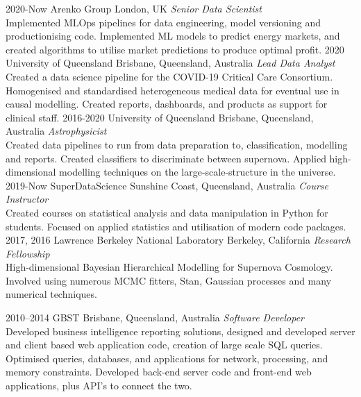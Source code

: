 \documentclass[]{friggeri-cv2}
\begin{document}
\begin{entrylist}

\entry
{2020-Now}
{Arenko Group}
{London, UK}
{\emph{Senior Data Scientist} \\
Implemented MLOps pipelines for data engineering, model versioning and productionising code. Implemented ML models to predict energy markets, and created algorithms to utilise market predictions to produce optimal profit.}
\entry
{2020}
{University of Queensland}
{Brisbane, Queensland, Australia}
{\emph{Lead Data Analyst} \\
Created a data science pipeline for the COVID-19 Critical Care Consortium. Homogenised and standardised heterogeneous medical data for eventual use in causal modelling. Created reports, dashboards, and products as support for clinical staff.}
\entry
{2016-2020}
{University of Queensland}
{Brisbane, Queensland, Australia}
{\emph{Astrophysicist} \\
Created data pipelines to run from data preparation to, classification, modelling and reports. Created classifiers to discriminate between supernova. Applied high-dimensional modelling techniques on the large-scale-structure in the universe.}
\entry
{2019-Now}
{SuperDataScience}
{Sunshine Coast, Queensland, Australia}
{\emph{Course Instructor} \\
Created courses on statistical analysis and data manipulation in Python for students. Focused on applied statistics and utilisation of modern code packages.}
\entry
{2017, 2016}
{Lawrence Berkeley National Laboratory}
{Berkeley, California}
{\emph{Research Fellowship} \\
High-dimensional Bayesian Hierarchical Modelling for Supernova Cosmology. Involved using numerous MCMC fitters, Stan, Gaussian processes and many numerical techniques.}



\entry
{2010--2014}
{GBST}
{Brisbane, Queensland, Australia}
{\emph{Software Developer} \\
Developed business intelligence reporting solutions, designed and developed server and client based web application code, creation of large scale SQL queries. Optimised queries, databases, and applications for network, processing, and memory constraints. Developed back-end server code and front-end web applications, plus API's to connect the two.}

\end{entrylist}
\end{document}
